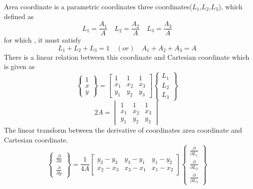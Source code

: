 \documentclass[main.tex]{subfiles}
\begin{document}
Area coordinate is a parametric coordinates three coordinates($L_1$,$L_2$,$L_3$), which defined as
\begin{equation}
L_1 = \frac{A_1}{A} \quad L_2 = \frac{A_2}{A} \quad L_3 = \frac{A_3}{A}
\end{equation}
for which , it must satisfy
\begin{equation}
L_1 + L_2 + L_3 = 1 \quad (or) \quad A_1 + A_2 + A_3 = A
\end{equation}
There is a linear relation between this coordinate and Cartesian coordinate which is given as
\begin{equation}
\left\{
\begin{array}{r}
1\\
x \\
y
\end{array} \right\}
=
\begin{bmatrix}
1 & 1 & 1 \\
x_1 & x_2 & x_3 \\
y_1 & y_2 & y_3  
\end{bmatrix} 
\left\{
\begin{array}{r}
L_1\\
L_2 \\
L_3
\end{array} \right\}
\end{equation}
\begin{equation}
2A = \begin{vmatrix}
1 & 1 & 1 \\
x_1 & x_2 & x_3 \\
y_1 & y_2 & y_3  
\end{vmatrix} 
\end{equation}
The linear transform between the derivative of coordinates area coordinate and Cartesian coordinate.
\begin{equation}
\left\{
\begin{array}{r}
 \frac{\partial}{\partial x}\\
\frac{\partial}{\partial y}
\end{array} \right\}
=
\frac{1}{4 A}
\begin{bmatrix}
y_2-y_3 & y_3-y_1 & y_1-y_2 \\
x_2-x_3 & x_3-x_1 & x_1-x_2
\end{bmatrix} 
\left\{
\begin{array}{r}
 \frac{\partial}{\partial L_1}\\
 \frac{\partial}{\partial L_2}\\
 \frac{\partial}{\partial L_3}
\end{array} \right\}
\end{equation}
\end{document}
